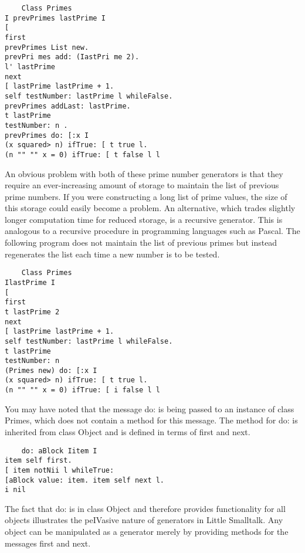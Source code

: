 \begin{lstlisting}
    Class Primes
I prevPrimes lastPrime I
[
first
prevPrimes List new.
prevPri mes add: (IastPri me 2).
l' lastPrime
next
[ lastPrime lastPrime + 1.
self testNumber: lastPrime l whileFalse.
prevPrimes addLast: lastPrime.
t lastPrime
testNumber: n .
prevPrimes do: [:x I
(x squared> n) ifTrue: [ t true l.
(n "" "" x = 0) ifTrue: [ t false l l
\end{lstlisting}

An obvious problem with both of these prime number generators is that they
require an ever-increasing amount of storage to maintain the list of previous
prime numbers. If you were constructing a long list of prime values, the size of
this storage could easily become a problem. An alternative, which trades
slightly longer computation time for reduced storage, is a recursive generator.
This is analogous to a recursive procedure in programming languages such as
Pascal. The following program does not maintain the list of previous primes but
instead regenerates the list each time a new number is to be tested.

\begin{lstlisting}
    Class Primes
IlastPrime I
[
first
t lastPrime 2
next
[ lastPrime lastPrime + 1.
self testNumber: lastPrime l whileFalse.
t lastPrime
testNumber: n
(Primes new) do: [:x I
(x squared> n) ifTrue: [ t true l.
(n "" "" x = 0) ifTrue: [ i false l l
\end{lstlisting}

You may have noted that the message do: is being passed to an instance of class
Primes, which does not contain a method for this message. The method for do: is
inherited from class Object and is defined in terms of first and next.

\begin{lstlisting}
    do: aBlock Iitem I
item self first.
[ item notNii l whileTrue:
[aBlock value: item. item self next l.
i nil
\end{lstlisting}

The fact that do: is in class Object and therefore provides functionality for
all objects illustrates the peIVasive nature of generators in Little Smalltalk.
Any object can be manipulated as a generator merely by providing methods for the
messages first and next.






\secup
